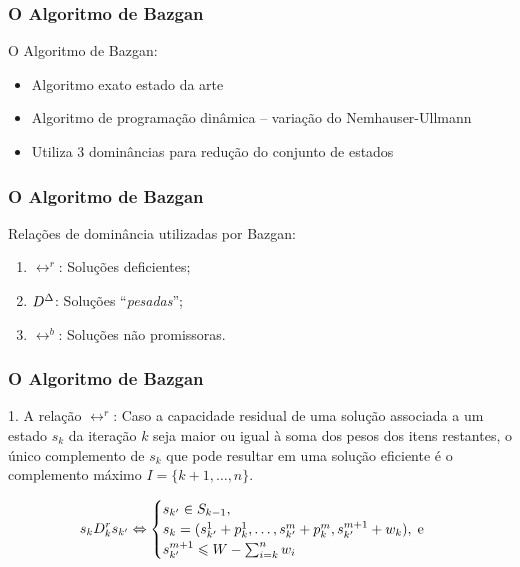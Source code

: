 \documentclass[10pt,xcolor=table,fleqn]{beamer}
\begin{document}
\begin{frame}
	\frametitle{O Algoritmo de Bazgan}
  \begin{block}{O Algoritmo de Bazgan:}
    \begin{itemize}
      \setlength\itemsep{0.8em}
      \item{ Algoritmo exato estado da arte }
      \item{ Algoritmo de programação dinâmica -- variação do Nemhauser-Ullmann }
      \item{ Utiliza 3 dominâncias para redução do conjunto de estados}
    \end{itemize}
  \end{block}
\end{frame}

\begin{frame}
	\frametitle{O Algoritmo de Bazgan}
  \begin{algorithm}[H]
    \footnotesize
    
    \caption{\small O algoritmo de Nemhauser e Ullmann para o \mokp.}
  \end{algorithm}
  \pause
  \begin{block}{Relações de dominância utilizadas por Bazgan:}
    \begin{enumerate}
      \item{ $\rel^r$: Soluções deficientes;}
      \item{ $D^{\Delta}$: Soluções ``\textit{pesadas}'';}
      \item{ $\rel^{b}$: Soluções não promissoras.}
    \end{enumerate}
  \end{block}
\end{frame}

\begin{frame}
	\frametitle{O Algoritmo de Bazgan}
  \begin{block}{1. A relação $\rel^r$:}
    Caso a capacidade residual de uma solução associada a um estado $s_k$
    da iteração $k$ seja maior ou igual à soma dos pesos dos itens restantes,
    o único complemento de $s_k$ que pode resultar
    em uma solução eficiente é o complemento máximo $I = \{k+1, \ldots, n\}$.
  \end{block}
  \pause
  \begin{displaymath}
    s_k D_k^r s_{{k'}}
      \Leftrightarrow
      \begin{cases}
        s_{{k'}} \in S_{k-1}, \\
        s_k = (s_{{k'}}^1 + p_k^1, \ldots, s_{{k'}}^m + p_k^m, s_{{k'}}^{m+1} + w_k), \; \text{e} \\
        s_{{k'}}^{m+1} \leqslant W - \sum_{i=k}^n w_i
      \end{cases}
  \end{displaymath}
\end{frame}
\end{document}

